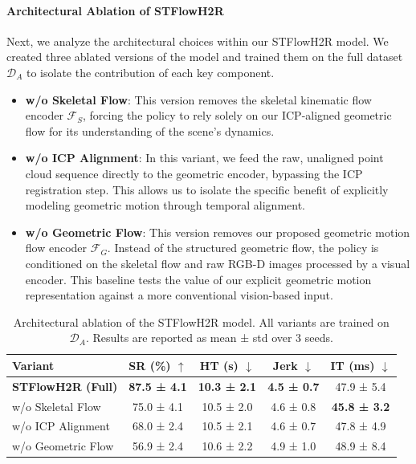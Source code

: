 \documentclass[final,5p,times,twocolumn]{elsarticle}
\begin{document}
\paragraph{Architectural Ablation of STFlowH2R}
Next, we analyze the architectural choices within our STFlowH2R model. We created three ablated versions of the model and trained them on the full dataset $\mathcal{D}_A$ to isolate the contribution of each key component.

\begin{itemize}
    \item \textbf{w/o Skeletal Flow}: This version removes the skeletal kinematic flow encoder $\mathcal{F}_S$, forcing the policy to rely solely on our ICP-aligned geometric flow for its understanding of the scene's dynamics.

    \item \textbf{w/o ICP Alignment}: In this variant, we feed the raw, unaligned point cloud sequence directly to the geometric encoder, bypassing the ICP registration step. This allows us to isolate the specific benefit of explicitly modeling geometric motion through temporal alignment.

    \item \textbf{w/o Geometric Flow}: This version removes our proposed geometric motion flow encoder $\mathcal{F}_G$. Instead of the structured geometric flow, the policy is conditioned on the skeletal flow and raw RGB-D images processed by a visual encoder. This baseline tests the value of our explicit geometric motion representation against a more conventional vision-based input.
\end{itemize}

\begin{table}[htbp]
\footnotesize
\centering
\caption{Architectural ablation of the STFlowH2R model. All variants are trained on $\mathcal{D}_A$. Results are reported as mean ± std over 3 seeds.}
\label{arch_ablation}
\begin{tabular}{lcccc}
\toprule
\textbf{Variant} & \textbf{SR (\%)} $\uparrow$ & \textbf{HT (s)} $\downarrow$ & \textbf{Jerk} $\downarrow$ & \textbf{IT (ms)} $\downarrow$ \\ 
\midrule
\textbf{STFlowH2R (Full)} & \textbf{87.5 ± 4.1} & \textbf{10.3 ± 2.1} & \textbf{4.5 ± 0.7} & 47.9 ± 5.4 \\
w/o Skeletal Flow         & 75.0 ± 4.1 & 10.5 ± 2.0 & 4.6 ± 0.8 & \textbf{45.8 ± 3.2} \\
w/o ICP Alignment         & 68.0 ± 2.4 & 10.5 ± 2.1 & 4.6 ± 0.7 & 47.8 ± 4.9 \\
w/o Geometric Flow        & 56.9 ± 2.4 & 10.6 ± 2.2 & 4.9 ± 1.0 & 48.9 ± 8.4 \\
\bottomrule
\end{tabular}
\end{table}
\end{document}
